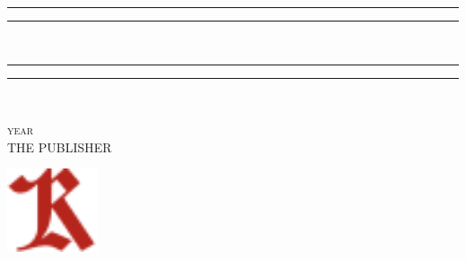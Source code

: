 \documentclass[oneside]{book}
\title{\textfrak{Kalevala}}
\author{\textfrak{koonnut:\\Elias Lönnrot}}
\begin{document}
\begin{titlepage}
    \centering
   
    \textcolor{BrickRed}{\rule{\textwidth}{1.6pt}\vspace*{-\baselineskip}\vspace*{2pt}
    \rule{\textwidth}{0.4pt}}\\[\baselineskip]
    \Huge{}
    \textcolor{BrickRed}{\rule{\textwidth}{0.4pt}\vspace*{-\baselineskip}\vspace{3.2pt}
    \rule{\textwidth}{1.6pt}}\\[\baselineskip]

    \vspace*{2\baselineskip}
    
    \LARGE{}
    
    \vfill
    {\scshape year} \\
    {\large THE PUBLISHER}\par
	\end{titlepage}
	
	\vspace*{5cm}
	\begin{center}
		\includegraphics[width=0.20\textwidth]{./img/k.pdf}
	\end{center}
		
\end{document}
